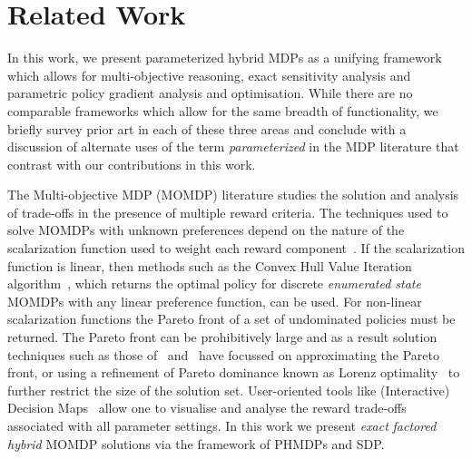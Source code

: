 \section{Related Work}
\label{sec:background}


In this work, we present parameterized hybrid MDPs as a unifying
framework which allows for multi-objective reasoning, exact
sensitivity analysis and parametric policy gradient analysis and
optimisation.  While there are no comparable frameworks which allow
for the same breadth of functionality, we briefly survey prior art in
each of these three areas and conclude with a discussion of alternate 
uses of the term \emph{parameterized} in the MDP literature that
contrast with our contributions in this work.

The Multi-objective MDP (MOMDP) literature studies the solution and
analysis of trade-offs in the presence of multiple reward criteria.
The techniques used to solve MOMDPs with unknown preferences depend on
the nature of the scalarization function used to weight each reward
component~\parencite{Roijers_JAIR_2013}. If the scalarization function
is linear, then methods such as the Convex Hull Value Iteration
algorithm~\parencite{Barrett_ICML_2008}, which returns the optimal
policy for discrete \emph{enumerated state} MOMDPs with any linear
preference function, can be used. For non-linear scalarization
functions the Pareto front of a set of undominated policies must be
returned. The Pareto front can be prohibitively large and as a result
solution techniques such as those of~\parencite{Chatterjee_STACS_2006}
and~\parencite{Pirotta_AAAI_2015} have focussed on approximating the
Pareto front, or using a refinement of Pareto dominance known as
Lorenz optimality~\parencite{Perny_AAAI_2013} to further restrict the
size of the solution set.  User-oriented tools like (Interactive)
Decision Maps~\cite{see_what_wikipedia_says} allow one to visualise
and analyse the reward trade-offs associated with all parameter
settings.  In this work we present \textit{exact} \emph{factored
  hybrid} MOMDP solutions via the framework of PHMDPs and SDP.

